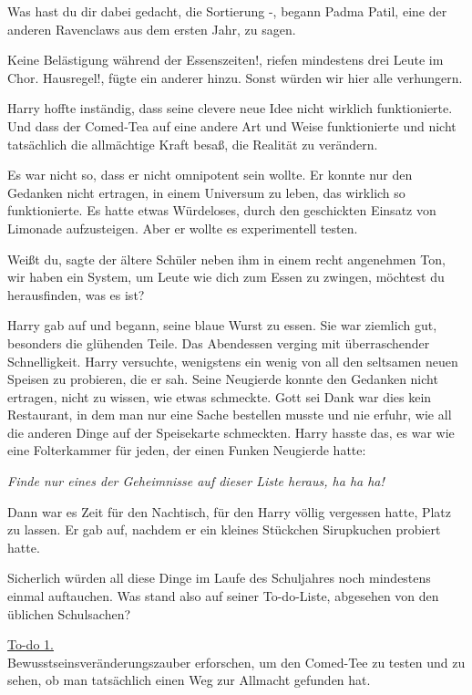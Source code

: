 \glqq{}Was hast du dir dabei gedacht, die Sortierung -\grqq{}, begann Padma
Patil, eine der anderen Ravenclaws aus dem ersten Jahr, zu sagen.

\glqq{}Keine Belästigung während der Essenszeiten!\grqq{}, riefen mindestens
drei Leute im Chor. \glqq{}Hausregel!\grqq{}, fügte ein anderer hinzu.
\glqq{}Sonst würden wir hier alle verhungern.\grqq{}

Harry hoffte inständig, dass seine clevere neue Idee nicht wirklich
funktionierte. Und dass der Comed-Tea auf eine andere Art und Weise
funktionierte und nicht tatsächlich die allmächtige Kraft besaß, die Realität zu
verändern.

Es war nicht so, dass er nicht omnipotent sein wollte. Er konnte nur den
Gedanken nicht ertragen, in einem Universum zu leben, das wirklich so
funktionierte. Es hatte etwas Würdeloses, durch den geschickten Einsatz von
Limonade aufzusteigen. Aber er wollte es experimentell testen.

\glqq{}Weißt du\grqq{}, sagte der ältere Schüler neben ihm in einem recht
angenehmen Ton, \glqq{}wir haben ein System, um Leute wie dich zum Essen zu
zwingen, möchtest du herausfinden, was es ist?\grqq{}

Harry gab auf und begann, seine blaue Wurst zu essen. Sie war ziemlich gut,
besonders die glühenden Teile. Das Abendessen verging mit überraschender
Schnelligkeit. Harry versuchte, wenigstens ein wenig von all den seltsamen neuen
Speisen zu probieren, die er sah. Seine Neugierde konnte den Gedanken nicht
ertragen, nicht zu wissen, wie etwas schmeckte. Gott sei Dank war dies kein
Restaurant, in dem man nur eine Sache bestellen musste und nie erfuhr, wie all
die anderen Dinge auf der Speisekarte schmeckten. Harry hasste das, es war wie
eine Folterkammer für jeden, der einen Funken Neugierde hatte:

\emph{Finde nur eines der Geheimnisse auf dieser Liste heraus, ha ha ha!}

Dann war es Zeit für den Nachtisch, für den Harry völlig vergessen hatte, Platz
zu lassen. Er gab auf, nachdem er ein kleines Stückchen Sirupkuchen probiert
hatte.

Sicherlich würden all diese Dinge im Laufe des Schuljahres noch mindestens
einmal auftauchen. Was stand also auf seiner To-do-Liste, abgesehen von den
üblichen Schulsachen?

\underline{To-do 1.}\\
Bewusstseinsveränderungszauber erforschen, um den Comed-Tee zu testen und zu
sehen, ob man tatsächlich einen Weg zur Allmacht gefunden hat.

